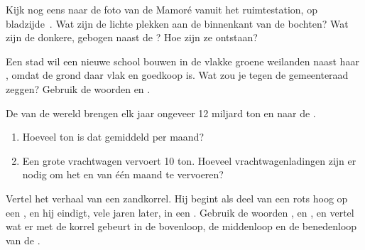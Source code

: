 \begin{exercise}[$\star\star$]\label{exo:g5:water-shapes-the-land:8}
Kijk nog eens naar de foto van de Mamoré vanuit het ruimtestation, op
bladzijde~\pageref{fig:g5:water-shapes-the-land:mamore}. Wat zijn de
lichte plekken aan de binnenkant van de bochten? Wat zijn de donkere,
gebogen  naast de ? Hoe zijn ze ontstaan?
\end{exercise}

\begin{exercise}[$\star\star$]\label{exo:g5:water-shapes-the-land:9}
Een stad wil een nieuwe school bouwen in de vlakke groene weilanden naast
haar , omdat de grond daar vlak en goedkoop is. Wat zou je tegen de
gemeenteraad zeggen? Gebruik de woorden \emph{} en
\emph{}.
\end{exercise}

\begin{exercise}[$\star\star$]\label{exo:g5:water-shapes-the-land:10}
De  van de wereld brengen elk jaar ongeveer 12 miljard ton  en
 naar de .
\begin{enumerate}
  \item[(a)] Hoeveel ton is dat gemiddeld per maand?
  \item[(b)] Een grote vrachtwagen vervoert 10 ton. Hoeveel
        vrachtwagenladingen zijn er nodig om het  en  van één maand
        te vervoeren?
\end{enumerate}
\end{exercise}

\begin{exercise}[$\star\star\star$]\label{exo:g5:water-shapes-the-land:11}
Vertel het verhaal van een zandkorrel. Hij begint als deel van een rots
hoog op een , en hij eindigt, vele jaren later, in een . Gebruik
de woorden \emph{}, \emph{} en \emph{}, en vertel
wat er met de korrel gebeurt in de bovenloop, de middenloop en de
benedenloop van de .
\end{exercise}
